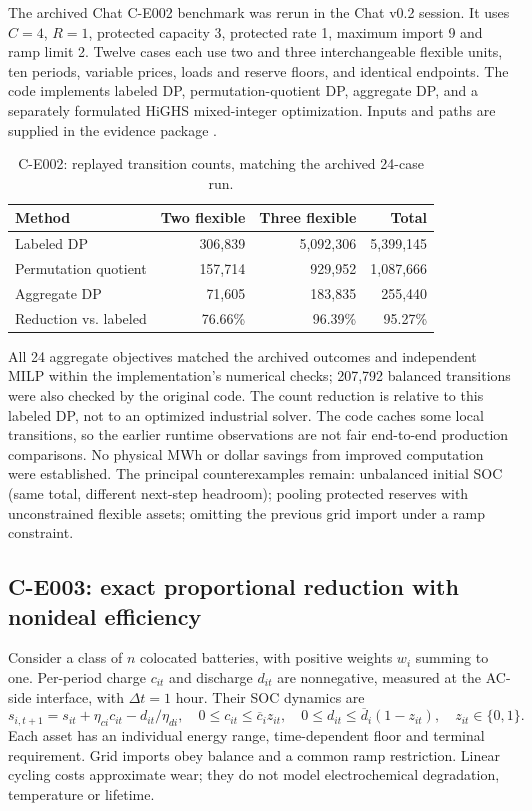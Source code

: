 \documentclass[11pt,letterpaper]{article}
\begin{document}
The archived Chat C-E002 benchmark was rerun in the Chat v0.2 session. It uses $C=4$, $R=1$, protected capacity 3, protected rate 1, maximum import 9 and ramp limit 2. Twelve cases each use two and three interchangeable flexible units, ten periods, variable prices, loads and reserve floors, and identical endpoints. The code implements labeled DP, permutation-quotient DP, aggregate DP, and a separately formulated HiGHS mixed-integer optimization. Inputs and paths are supplied in the evidence package \cite{evidence}.
\begin{table}[htbp]
\centering\small
\caption{C-E002: replayed transition counts, matching the archived 24-case run.}
\begin{tabular}{lrrr}
\toprule
Method & Two flexible & Three flexible & Total\\
\midrule
Labeled DP & 306,839 & 5,092,306 & 5,399,145\\
Permutation quotient & 157,714 & 929,952 & 1,087,666\\
Aggregate DP & 71,605 & 183,835 & 255,440\\
\midrule
Reduction vs. labeled & 76.66\% & 96.39\% & 95.27\%\\
\bottomrule
\end{tabular}
\end{table}
All 24 aggregate objectives matched the archived outcomes and independent MILP within the implementation's numerical checks; 207,792 balanced transitions were also checked by the original code. The count reduction is relative to this labeled DP, not to an optimized industrial solver. The code caches some local transitions, so the earlier runtime observations are not fair end-to-end production comparisons. No physical MWh or dollar savings from improved computation were established. The principal counterexamples remain: unbalanced initial SOC (same total, different next-step headroom); pooling protected reserves with unconstrained flexible assets; omitting the previous grid import under a ramp constraint.

\subsection{C-E003: exact proportional reduction with nonideal efficiency}
\label{sec:e003}
Consider a class of $n$ colocated batteries, with positive weights $w_i$ summing to one. Per-period charge $c_{it}$ and discharge $d_{it}$ are nonnegative, measured at the AC-side interface, with $\Delta t=1$ hour. Their SOC dynamics are
\[
s_{i,t+1}=s_{it}+\eta_{ci}c_{it}-d_{it}/\eta_{di},\quad
0\le c_{it}\le \overline c_i z_{it},\quad
0\le d_{it}\le \overline d_i(1-z_{it}),\quad z_{it}\in\{0,1\}.
\]
Each asset has an individual energy range, time-dependent floor and terminal requirement. Grid imports obey balance and a common ramp restriction. Linear cycling costs approximate wear; they do not model electrochemical degradation, temperature or lifetime.
\end{document}

